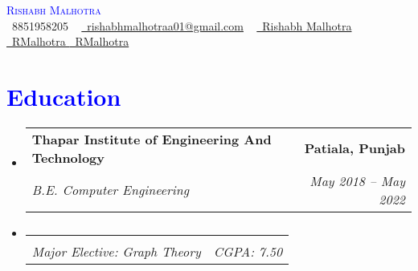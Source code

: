 \documentclass[letterpaper,11pt]{article}
\makeatletter
\newcommand{\resumeSubheading}[4]{
  \vspace{-2pt}\item
    \begin{tabular*}{1.0\textwidth}[t]{l@{\extracolsep{\fill}}r}
      \textbf{#1} & \textbf{\small #2} \\
      \textit{\small#3} & \textit{\small #4} \\
    \end{tabular*}\vspace{-7pt}
}
\newcommand{\resumeSubHeadingListStart}{\begin{itemize}[leftmargin=0.0in, label={}]}
\newcommand{\resumeSubHeadingListEnd}{\end{itemize}}
\makeatother
\begin{document}

\begin{center}
    {\Huge \scshape \textcolor{blue}{ Rishabh Malhotra}} \\ \vspace{5pt}
    \small \raisebox{-0.1\height}\faPhone\ 8851958205 ~ \href{mailto:rishabhmalhotraa01@gmail.com}{\raisebox{-0.2\height}\faEnvelope\  rishabhmalhotraa01@gmail.com} ~ 
    \href{https://linkedin.com/in/rishabh-malhotra-4536a418b/}{\raisebox{-0.2\height}\faLinkedin\ Rishabh Malhotra}  ~
    \href{https://github.com/Rishabh-malhotraa}{\raisebox{-0.2\height}\faGithub\ RMalhotra   }
    \href{https://linktr.ee/Rishabh_malhotra}{\raisebox{-0.2\height}\faCode\ RMalhotra}
    \vspace{-8pt}
\end{center}\vspace{+10pt}


    \section{\Large \textcolor{blue}{Education}}
  \resumeSubHeadingListStart
    \resumeSubheading
      {Thapar Institute of Engineering And Technology}{Patiala, Punjab}
      {B.E. Computer Engineering }{May 2018 -- May 2022}
    
      \vspace{-18pt} 
      \resumeSubheading{}{}  
      {Major Elective: Graph Theory}
      {CGPA: 7.50}
      
  \resumeSubHeadingListEnd
\end{document}
